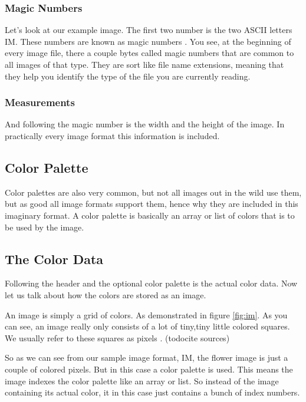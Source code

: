 \begin{refsection}
  \subsubsection{Magic Numbers}
  \label{sec:magic-numbers}

  Let's look at our example image. The first two number is the two
  ASCII letters IM. These numbers are known as magic numbers
  . You see, at the beginning of every image
  file, there a couple bytes called magic numbers that are common to
  all images of that type. They are sort like file name extensions,
  meaning that they help you identify the type of the file you are
  currently reading.

  \subsubsection{Measurements}
  \label{sec:measurements}

  And following the magic number is the width and the height of the
  image. In practically every image format this information is
  included.

  \subsection{Color Palette}
  \label{sec:color-pallete}

  Color palettes  are also very common, but not
  all images out in the wild use them, but as good all image formats support
  them, hence why they are included in this imaginary format. A color
  palette is basically an array or list of colors that is to be used
  by the image.

  \subsection{The Color Data}

  Following the header and the optional color palette is the actual
  color data. Now let us talk about how the colors are stored as an
  image.

  An image is simply a grid of colors. As demonstrated in figure
  \ref{fig:im}. As you can
  see, an image really only consists of a lot of tiny,tiny little
  colored squares. We usually refer to these squares as pixels
  . (todo{cite sources})

  So as we can see from our sample image format, IM, the flower image
  is just a couple of colored pixels. But in this case a color palette
  is used. This means the image indexes the color palette like an
  array or list. So instead of the image containing its actual color,
  it in this case just contains a bunch of index numbers.


\end{refsection}
